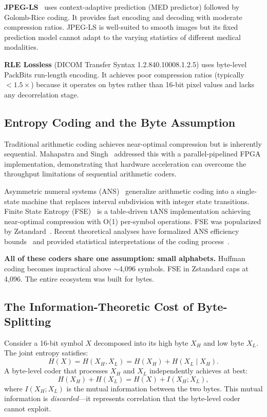 \documentclass[10pt,twocolumn]{article}
\begin{document}
\textbf{JPEG-LS}~\cite{jpegls} uses context-adaptive prediction (MED predictor) followed by Golomb-Rice coding. It provides fast encoding and decoding with moderate compression ratios. JPEG-LS is well-suited to smooth images but its fixed prediction model cannot adapt to the varying statistics of different medical modalities.

\textbf{RLE Lossless} (DICOM Transfer Syntax 1.2.840.10008.1.2.5) uses byte-level PackBits run-length encoding. It achieves poor compression ratios (typically $<1.5\times$) because it operates on bytes rather than 16-bit pixel values and lacks any decorrelation stage.

\subsection{Entropy Coding and the Byte Assumption}

Traditional arithmetic coding achieves near-optimal compression but is inherently sequential. Mahapatra and Singh~\cite{mahapatra2007fpga} addressed this with a parallel-pipelined FPGA implementation, demonstrating that hardware acceleration can overcome the throughput limitations of sequential arithmetic coders.

Asymmetric numeral systems (ANS)~\cite{duda2009ans,duda2013ans} generalize arithmetic coding into a single-state machine that replaces interval subdivision with integer state transitions. Finite State Entropy (FSE)~\cite{fse} is a table-driven tANS implementation achieving near-optimal compression with O(1) per-symbol operations. FSE was popularized by Zstandard~\cite{zstd}. Recent theoretical analyses have formalized ANS efficiency bounds~\cite{kosolobov2022} and provided statistical interpretations of the coding process~\cite{bamler2022}.

\textbf{All of these coders share one assumption: small alphabets.} Huffman coding becomes impractical above $\sim$4,096 symbols. FSE in Zstandard caps at 4,096. The entire ecosystem was built for bytes.

\subsection{The Information-Theoretic Cost of Byte-Splitting}
\label{sec:infocost}

Consider a 16-bit symbol $X$ decomposed into its high byte $X_H$ and low byte $X_L$. The joint entropy satisfies:
\begin{equation}
  H(X) = H(X_H, X_L) = H(X_H) + H(X_L \mid X_H).
\end{equation}
A byte-level coder that processes $X_H$ and $X_L$ independently achieves at best:
\begin{equation}
  H(X_H) + H(X_L) = H(X) + I(X_H; X_L),
\end{equation}
where $I(X_H; X_L)$ is the mutual information between the two bytes. This mutual information is \emph{discarded}---it represents correlation that the byte-level coder cannot exploit.
\end{document}
